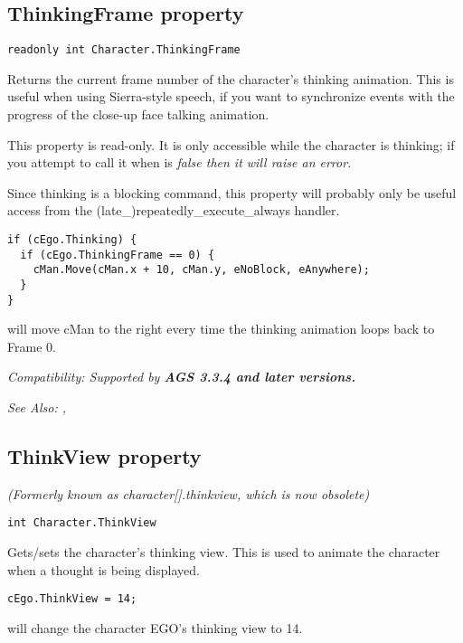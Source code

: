 \subsection{ThinkingFrame property}\label{Character.ThinkingFrame}%

\begin{verbatim}
readonly int Character.ThinkingFrame
\end{verbatim}
Returns the current frame number of the character's thinking animation. This is
useful when using Sierra-style speech, if you want to synchronize events with the
progress of the close-up face talking animation.

This property is read-only. It is only accessible while the character is thinking;
if you attempt to call it when  is
\it{false} then it will raise an error.

Since thinking is a blocking command, this property will probably only be useful
access from the (late_)repeatedly_execute_always handler.

\begin{verbatim}
if (cEgo.Thinking) {
  if (cEgo.ThinkingFrame == 0) {
    cMan.Move(cMan.x + 10, cMan.y, eNoBlock, eAnywhere);
  }
}
\end{verbatim}
will move cMan to the right every time the thinking animation loops back to Frame 0.

\it{Compatibility:} Supported by \bf{AGS 3.3.4} and later versions.

\it{See Also:} ,


\subsection{ThinkView property}\label{Character.ThinkView}%

\it{(Formerly known as character[].thinkview, which is now obsolete)}

\begin{verbatim}
int Character.ThinkView
\end{verbatim}
Gets/sets the character's thinking view. This is used to animate the character
when a thought is being displayed.

\begin{verbatim}
cEgo.ThinkView = 14;
\end{verbatim}
will change the character EGO's thinking view to 14.

